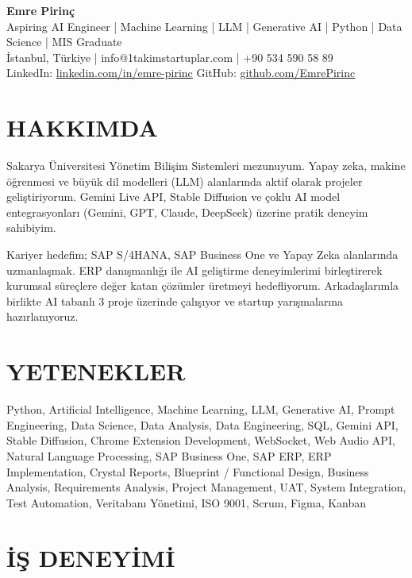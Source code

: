 \documentclass[a4paper,8pt]{article}
\begin{document}
\begin{center}
{\Large\bfseries Emre Pirinç}\\[2pt]
{\small Aspiring AI Engineer | Machine Learning | LLM | Generative AI | Python | Data Science | MIS Graduate}\\[2pt]
{\small İstanbul, Türkiye | info@1takimstartuplar.com | +90 534 590 58 89}\\[1pt]
{\small LinkedIn: \href{https://linkedin.com/in/emre-pirinc}{linkedin.com/in/emre-pirinc} \textbar{} GitHub: \href{https://github.com/EmrePirinc}{github.com/EmrePirinc}}
\end{center}

\vspace{-2pt}

\section{HAKKIMDA}
{\small Sakarya Üniversitesi Yönetim Bilişim Sistemleri mezunuyum. Yapay zeka, makine öğrenmesi ve büyük dil modelleri (LLM) alanlarında aktif olarak projeler geliştiriyorum. Gemini Live API, Stable Diffusion ve çoklu AI model entegrasyonları (Gemini, GPT, Claude, DeepSeek) üzerine pratik deneyim sahibiyim.

Kariyer hedefim; SAP S/4HANA, SAP Business One ve Yapay Zeka alanlarında uzmanlaşmak. ERP danışmanlığı ile AI geliştirme deneyimlerimi birleştirerek kurumsal süreçlere değer katan çözümler üretmeyi hedefliyorum. Arkadaşlarımla birlikte AI tabanlı 3 proje üzerinde çalışıyor ve startup yarışmalarına hazırlanıyoruz.}

\section{YETENEKLER}
{\small Python, Artificial Intelligence, Machine Learning, LLM, Generative AI, Prompt Engineering, Data Science, Data Analysis, Data Engineering, SQL, Gemini API, Stable Diffusion, Chrome Extension Development, WebSocket, Web Audio API, Natural Language Processing, SAP Business One, SAP ERP, ERP Implementation, Crystal Reports, Blueprint / Functional Design, Business Analysis, Requirements Analysis, Project Management, UAT, System Integration, Test Automation, Veritabanı Yönetimi, ISO 9001, Scrum, Figma, Kanban}

\section{İŞ DENEYİMİ}
\end{document}
